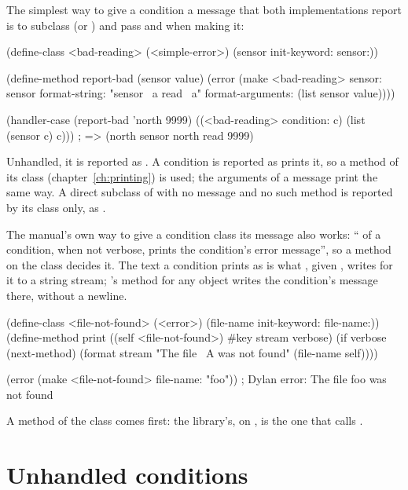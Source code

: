 The simplest way to give a condition a message that both
implementations report is to subclass  (or
) and pass  and
 when making it:

\begin{dylan}
(define-class <bad-reading> (<simple-error>)
  (sensor init-keyword: sensor:))

(define-method report-bad (sensor value)
  (error (make <bad-reading> sensor: sensor
               format-string: "sensor ~a read ~a"
               format-arguments: (list sensor value))))

(handler-case (report-bad 'north 9999)
  ((<bad-reading> condition: c) (list (sensor c) c)))
; => (north sensor north read 9999)
\end{dylan}

\noindent Unhandled, it is reported as . A
condition is reported as  prints it, so a
 method of its class (chapter~\ref{ch:printing}) is
used; the arguments of a message print the same way. A direct subclass
of  with no message and no such method is reported by its
class only, as .

The manual's own way to give a condition class its message also works:
`` of a condition, when not verbose, prints the condition's
error message'', so a  method on the class decides it. The
text a condition prints as is what , given , writes for it to a string stream; 's method for any
object writes the condition's message there, without a newline.

\begin{dylan}
(define-class <file-not-found> (<error>) (file-name init-keyword: file-name:))
(define-method print ((self <file-not-found>) #key stream verbose)
  (if verbose
      (next-method)
      (format stream "The file ~A was not found" (file-name self))))

(error (make <file-not-found> file-name: "foo"))
; Dylan error: The file foo was not found
\end{dylan}

\noindent A  method of the class comes first: the
library's, on , is the one that calls .

\section{Unhandled conditions}\label{sec:conditions-unhandled}

